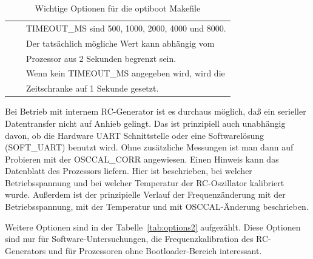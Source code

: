 \begin{table}[H]
\begin{center}
\begin{tabular}{| c | c | l |}
                   &                & TIMEOUT\_MS sind 500, 1000, 2000, 4000 und 8000. \\
                   &                & Der tatsächlich mögliche Wert kann abhängig vom \\
                   &                & Prozessor aus 2 Sekunden begrenzt sein. \\
                   &                & Wenn kein TIMEOUT\_MS angegeben wird, wird die \\
                   &                & Zeitschranke auf 1 Sekunde gesetzt. \\
    \hline
    \end{tabular}
  \end{center}
  \caption{Wichtige Optionen für die optiboot Makefile}
  \label{tab:options1}
\end{table}

Bei Betrieb mit internem RC-Generator ist es durchaus möglich, daß ein serieller Datentransfer
nicht auf Anhieb gelingt. Das ist prinzipiell auch unabhängig davon, ob die Hardware UART
Schnittstelle oder eine Softwarelösung (SOFT\_UART) benutzt wird. Ohne zusätzliche Messungen
ist man dann auf Probieren mit der OSCCAL\_CORR angewiesen. Einen Hinweis kann
das Datenblatt des Prozessors liefern. Hier ist beschrieben, bei welcher Betriebsspannung
und bei welcher Temperatur der RC-Oszillator kalibriert wurde. Außerdem ist der
prinzipielle Verlauf der Frequenzänderung mit der Betriebsspannung, mit der Temperatur und
mit OSCCAL-Änderung beschrieben. 


Weitere Optionen sind in der Tabelle~\ref{tab:options2} aufgezählt. 
Diese Optionen sind nur für Software-Untersuchungen, die Frequenzkalibration des RC-Generators
 und für Prozessoren ohne Bootloader-Bereich interessant.


